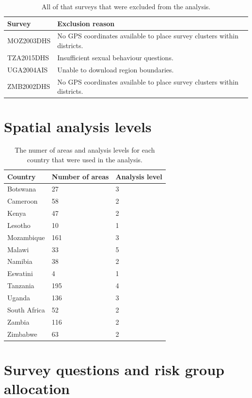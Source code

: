 \documentclass[a4paper, nobind]{templates/ociamthesis}
\begin{document}
\begin{table}[h]
\centering
\begin{tabularx}{\textwidth}{lX}
\toprule
Survey & Exclusion reason \\ 
 \midrule
MOZ2003DHS & No GPS coordinates available to place survey clusters within districts. \\
TZA2015DHS & Insufficient sexual behaviour questions. \\
UGA2004AIS & Unable to download region boundaries. \\
ZMB2002DHS & No GPS coordinates available to place survey clusters within districts. \\
\bottomrule
\end{tabularx}
\label{tab:surveys-excluded}
\caption{All of that surveys that were excluded from the analysis.}
\end{table}

\hypertarget{spatial-analysis-levels}{%
\section{Spatial analysis levels}\label{spatial-analysis-levels}}

\begin{table}[h]
\centering
\begin{tabularx}{\textwidth}{lXX}
\toprule
Country & Number of areas & Analysis level \\ 
\midrule
Botswana & 27 & 3 \\ 
Cameroon & 58 & 2 \\ 
Kenya & 47 & 2 \\ 
Lesotho & 10 & 1 \\ 
Mozambique & 161 & 3 \\ 
Malawi & 33 & 5 \\ 
Namibia & 38 & 2 \\ 
Eswatini & 4 & 1 \\ 
Tanzania & 195 & 4 \\ 
Uganda & 136 & 3 \\ 
South Africa & 52 & 2 \\ 
Zambia & 116 & 2 \\ 
Zimbabwe & 63 & 2 \\ 
\bottomrule
\end{tabularx}
\label{tab:area-levels}
\caption{The numer of areas and analysis levels for each country that were used in the analysis.}
\end{table}

\hypertarget{survey-questions}{%
\section{Survey questions and risk group allocation}\label{survey-questions}}
\end{document}
